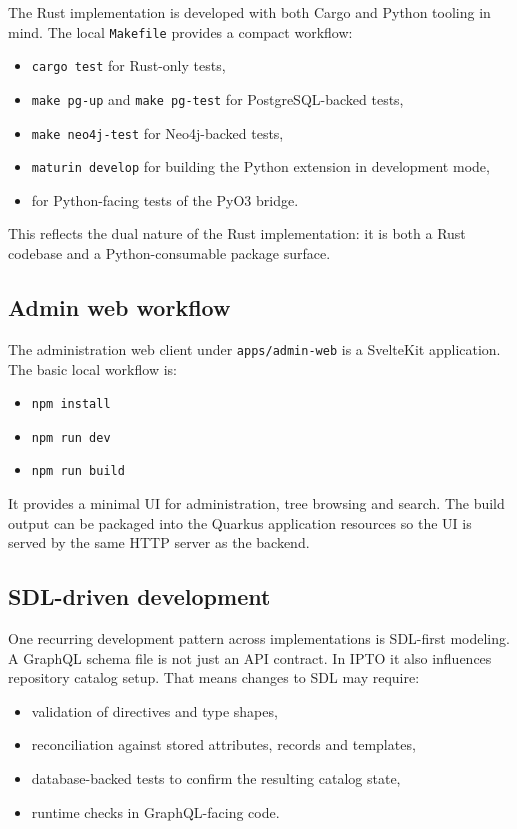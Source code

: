 The Rust implementation is developed with both Cargo and Python tooling in mind. The local \texttt{Makefile} provides a compact workflow:
\begin{itemize}
\item \texttt{cargo test} for Rust-only tests,
\item \texttt{make pg-up} and \texttt{make pg-test} for PostgreSQL-backed tests,
\item \texttt{make neo4j-test} for Neo4j-backed tests,
\item \texttt{maturin develop} for building the Python extension in development mode,
\item {} for Python-facing tests of the PyO3 bridge.
\end{itemize}

This reflects the dual nature of the Rust implementation: it is both a Rust codebase and a Python-consumable package surface.

\subsection{Admin web workflow}

The administration web client under \texttt{apps/admin-web} is a SvelteKit application. The basic local workflow is:
\begin{itemize}
\item \texttt{npm install}
\item \texttt{npm run dev}
\item \texttt{npm run build}
\end{itemize}

It provides a minimal UI for administration, tree browsing and search. The build output can be packaged into the Quarkus application resources so the UI is served by the same HTTP server as the backend.

\subsection{SDL-driven development}

One recurring development pattern across implementations is SDL-first modeling. A GraphQL schema file is not just an API contract. In IPTO it also influences repository catalog setup. That means changes to SDL may require:
\begin{itemize}
\item validation of directives and type shapes,
\item reconciliation against stored attributes, records and templates,
\item database-backed tests to confirm the resulting catalog state,
\item runtime checks in GraphQL-facing code.
\end{itemize}

